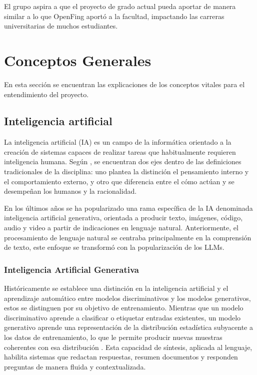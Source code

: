 El grupo aspira a que el proyecto de grado actual pueda aportar de manera similar a lo que OpenFing aportó a la facultad, impactando las carreras universitarias de muchos estudiantes.

\section{Conceptos Generales}
\label{section:2-Conceptos Generales}
En esta sección se encuentran las explicaciones de los conceptos vitales para el entendimiento del proyecto.



\subsection{Inteligencia artificial}
\label{subsection:2-Inteligencia artificial}

La inteligencia artificial (IA) es un campo de la informática orientado a la creación de sistemas capaces de realizar tareas que habitualmente requieren inteligencia humana. Según \cite{RussellNorvig2020}, se encuentran dos ejes dentro de las definiciones tradicionales de la disciplina: uno plantea la distinción el pensamiento interno y el comportamiento externo, y otro que diferencia entre el cómo actúan y se desempeñan los humanos y la racionalidad.

En los últimos años se ha popularizado una rama específica de la IA denominada inteligencia artificial generativa, orientada a producir texto, imágenes, código, audio y video a partir de indicaciones en lenguaje natural.
Anteriormente, el procesamiento de lenguaje natural se centraba principalmente en la comprensión de texto, este enfoque se transformó con la popularización de los LLMs.

\subsubsection{Inteligencia Artificial Generativa}
\label{subsubsection:2-Inteligencia Artificial Generativa}

Históricamente se establece una distinción en la inteligencia artificial y el aprendizaje automático entre modelos discriminativos y los modelos generativos, estos se distinguen por su objetivo de entrenamiento. Mientras que un modelo discriminativo aprende a clasificar o etiquetar entradas existentes, un modelo generativo aprende una representación de la distribución estadística subyacente a los datos de entrenamiento, lo que le permite producir nuevas muestras coherentes con esa distribución \cite{Goodfellow-et-al-2016}. Esta capacidad de síntesis, aplicada al lenguaje, habilita sistemas que redactan respuestas, resumen documentos y responden preguntas de manera fluida y contextualizada.

